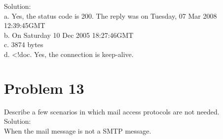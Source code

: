 \documentclass{article}
\begin{document}
\noindent Solution:\\
a. Yes, the status code is 200. The reply was on Tuesday, 07 Mar 2008 12:39:45GMT\\
b. On Saturday 10 Dec 2005 18:27:46GMT\\
c. 3874 bytes\\
d. \textless !doc. Yes, the connection is keep-alive.\\

\newpage
\section{Problem 13} Describe a few scenarios in which mail access protocols are not needed.\\

\noindent Solution:\\
When the mail message is not a SMTP message.
\end{document}
